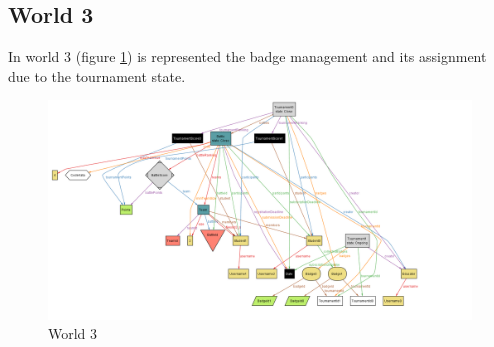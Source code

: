 \subsection*{World 3}
In world 3 (figure \ref{fig:world3}) is represented the badge management and its assignment due to the tournament state.
\begin{figure}
        \centering
        \includegraphics[scale = 0.5]{images/W3.png}
        \caption{World 3}
        \label{fig:world3}
\end{figure}
